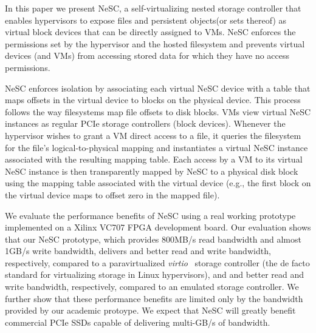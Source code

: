 In this paper we present NeSC, a self-virtualizing nested storage controller that enables hypervisors to expose files and persistent objects\footnotemark (or sets thereof) as virtual block devices that can be directly assigned to VMs. NeSC enforces the permissions set by the hypervisor and the hosted filesystem and prevents virtual devices (and VMs) from accessing stored data for which they have no access permissions.


NeSC enforces isolation by associating each virtual NeSC device with a table that maps offsets in the virtual device to blocks on the physical device. This process follows the way filesystems map file offsets to disk blocks.
%
VMs view virtual NeSC instances as regular PCIe storage controllers (block devices). Whenever the hypervisor wishes to grant a VM direct access to a file, it queries the filesystem for the file's logical-to-physical mapping and instantiates a virtual NeSC instance associated with the resulting mapping table.
%
Each access by a VM to its virtual NeSC instance is then transparently mapped by NeSC to a physical disk block using the mapping table associated with the virtual device (e.g., the first block on the virtual device maps to offset zero in the mapped file).

We evaluate the performance benefits of NeSC using a real working prototype implemented on a Xilinx VC707 FPGA development board. Our evaluation shows that our NeSC prototype, which provides 800MB/s read bandwidth and almost 1GB/s write bandwidth, delivers  and  better read and write bandwidth, respectively, compared to a paravirtualized \emph{virtio}~\cite{russell2008virtio} storage controller (the de facto standard for virtualizing storage in Linux hypervisors), and  and  better read and write bandwidth, respectively, compared to an emulated storage controller.
We further show that these performance benefits are limited only by the bandwidth provided by our academic protoype. We expect that NeSC will greatly benefit commercial PCIe SSDs capable of delivering multi-GB/s of bandwidth.

